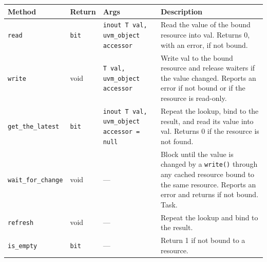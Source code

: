 \documentclass[11pt,letterpaper]{report}
\begin{document}
\begin{xltabular}{\linewidth}{>{\small}p{1.35in} >{\small}p{1.25in} >{\small}p{0.95in} >{\small}X}
\toprule
\textbf{Method} & \textbf{Return} & \textbf{Args} & \textbf{Description} \\
\midrule
\endhead
\bottomrule
\endfoot
\texttt{read} & \texttt{bit} & \texttt{inout T val, uvm\_object accessor} & Read the value of the bound resource into val. Returns 0, with an error, if not bound. \\
\texttt{write} & void & \texttt{T val, uvm\_object accessor} & Write val to the bound resource and release waiters if the value changed. Reports an error if not bound or if the resource is read-only. \\
\texttt{get\_the\_latest} & \texttt{bit} & \texttt{inout T val, uvm\_object accessor = null} & Repeat the lookup, bind to the result, and read its value into val. Returns 0 if the resource is not found. \\
\texttt{wait\_for\_change} & void & --- & Block until the value is changed by a \texttt{write()} through any cached resource bound to the same resource. Reports an error and returns if not bound. Task. \\
\texttt{refresh} & void & --- & Repeat the lookup and bind to the result. \\
\texttt{is\_empty} & \texttt{bit} & --- & Return 1 if not bound to a resource. \\
\end{xltabular}
\end{document}
